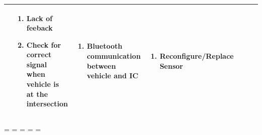 \documentclass [10pt]{article}
\begin{document}
{\begin{minipage}{\textwidth}
\begin{longtable}{ |p{ }  | p{ } |  p{ } |  p{ } | p{ } | p{ } |  p{ }|}
\begin{minipage}{.22\textwidth}
        \end{minipage}
    & \begin{minipage}{.18\textwidth} 
                \begin{enumerate}
                    \item Lack of feeback
                    \item Check for correct signal when vehicle is at the intersection\vspace {1mm}
                \end{enumerate}
        \end{minipage}
    & \cellcolor{tableCell}\begin{minipage}{.22\textwidth} 
                \vspace{2mm}
                \begin{enumerate}
                    \item Bluetooth communication between vehicle and IC \vspace {1mm}
                \end{enumerate}
        \end{minipage}
    
    
    & \begin{minipage}{.24 \columnwidth} 
                \vspace{2mm}
                \begin{enumerate}
                    \item Reconfigure/Replace Sensor \vspace {1mm}
                \end{enumerate}
        \end{minipage} \\ \hline
 
    
    
    
 
 
 \end{longtable}
    
    
    
    \end{minipage}}






\begin{landscape}
\end{landscape}
\endgroup


\newpage
\paperwidth=\pdfpageheight
\paperheight=\pdfpagewidth
\pdfpageheight=\paperheight
\pdfpagewidth=\paperwidth
\headwidth=\textwidth
\end{document}
